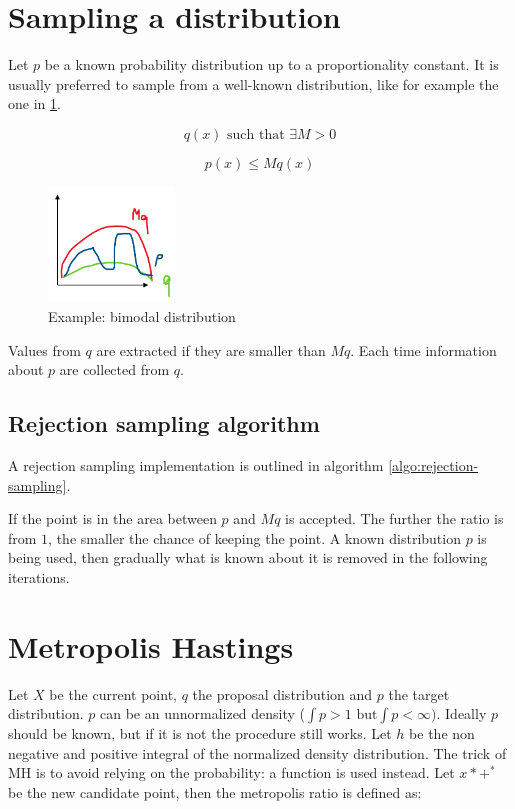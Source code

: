 \section{Sampling a distribution}
Let $p$ be a known probability distribution up to a proportionality constant.
It is usually preferred to sample from a well-known distribution, like for example the one in \ref{fig:bimodal}.

$$q(x)\text{ such that }\exists M>0$$

$$p(x) \leq M q(x)$$


\begin{figure}
  \centering
  \includegraphics[width=0.3\textwidth]{distribution.png}
  \caption{Example: bimodal distribution}
  \label{fig:bimodal}
\end{figure}

Values from $q$ are extracted if they are smaller than $Mq$.
Each time information about $p$ are collected from $q$.

  \subsection{Rejection sampling algorithm}
  A rejection sampling implementation is outlined in algorithm \ref{algo:rejection-sampling}.

  

  If the point is in the area between $p$ and $Mq$ is accepted.
  The further the ratio is from $1$, the smaller the chance of keeping the point.
  A known distribution $p$ is being used, then gradually what is known about it is removed in the following iterations.

\section{Metropolis Hastings}
Let $X$ be the current point, $q$ the proposal distribution and $p$ the target distribution.
$p$ can be an unnormalized density ($\int p > 1 \text{ but} \int p < \infty)$.
Ideally $p$ should be known, but if it is not the procedure still works.
Let $h$ be the non negative and positive integral of the normalized density distribution.
The trick of MH is to avoid relying on the probability: a function is used instead.
Let $x*+^*$ be the new candidate point, then the metropolis ratio is defined as:

